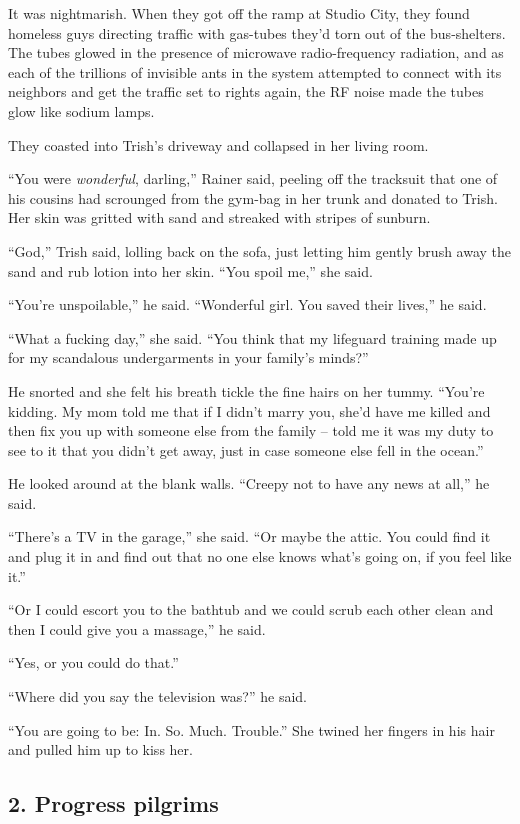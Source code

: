 It was nightmarish. When they got off the ramp at Studio City, they 
found homeless guys directing traffic with gas-tubes they'd torn out of 
the bus-shelters. The tubes glowed in the presence of microwave 
radio-frequency radiation, and as each of the trillions of invisible 
ants in the system attempted to connect with its neighbors and get the 
traffic set to rights again, the RF noise made the tubes glow like 
sodium lamps.

They coasted into Trish's driveway and collapsed in her living room.

“You were \emph{wonderful}, darling,” Rainer said, peeling off the 
tracksuit that one of his cousins had scrounged from the gym-bag in her 
trunk and donated to Trish. Her skin was gritted with sand and streaked 
with stripes of sunburn.

“God,” Trish said, lolling back on the sofa, just letting him 
gently brush away the sand and rub lotion into her skin. “You spoil 
me,” she said.

“You're unspoilable,” he said. “Wonderful girl. You saved their 
lives,” he said.

“What a fucking day,” she said. “You think that my lifeguard 
training made up for my scandalous undergarments in your family's 
minds?”

He snorted and she felt his breath tickle the fine hairs on her tummy. 
“You're kidding. My mom told me that if I didn't marry you, she'd 
have me killed and then fix you up with someone else from the family -- 
told me it was my duty to see to it that you didn't get away, just in 
case someone else fell in the ocean.”

He looked around at the blank walls. “Creepy not to have any news at 
all,” he said.

“There's a TV in the garage,” she said. “Or maybe the attic. You 
could find it and plug it in and find out that no one else knows what's 
going on, if you feel like it.”

“Or I could escort you to the bathtub and we could scrub each other 
clean and then I could give you a massage,” he said.

“Yes, or you could do that.”

“Where did you say the television was?” he said.

“You are going to be: In. So. Much. Trouble.” She twined her 
fingers in his hair and pulled him up to kiss her.


\subsection{2. Progress pilgrims}

